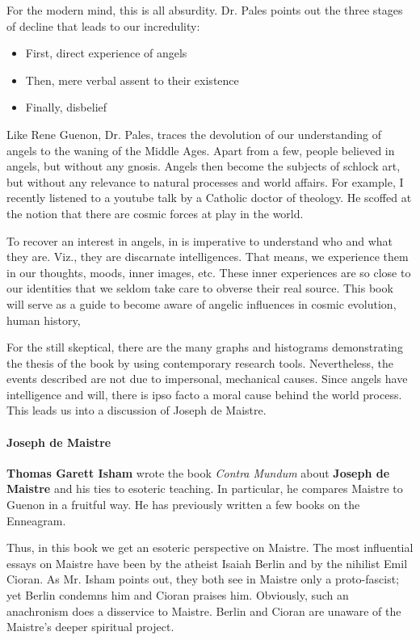 For the modern mind, this is all absurdity. Dr. Pales points out the three stages of decline that leads to our incredulity:

\begin{itemize}


\item First, direct experience of angels

\item Then, mere verbal assent to their existence

\item Finally, disbelief
\end{itemize}


Like Rene Guenon, Dr. Pales, traces the devolution of our understanding of angels to the waning of the Middle Ages. Apart from a few, people believed in angels, but without any gnosis. Angels then become the subjects of schlock art, but without any relevance to natural processes and world affairs. For example, I recently listened to a youtube talk by a Catholic doctor of theology. He scoffed at the notion that there are cosmic forces at play in the world.

To recover an interest in angels, in is imperative to understand who and what they are. Viz., they are discarnate intelligences. That means, we experience them in our thoughts, moods, inner images, etc. These inner experiences are so close to our identities that we seldom take care to obverse their real source. This book will serve as a guide to become aware of angelic influences in cosmic evolution, human history,

For the still skeptical, there are the many graphs and histograms demonstrating the thesis of the book by using contemporary research tools. Nevertheless, the events described are not due to impersonal, mechanical causes. Since angels have intelligence and will, there is ipso facto a moral cause behind the world process. This leads us into a discussion of Joseph de Maistre.

\paragraph{Joseph de Maistre}


\textbf{Thomas Garett Isham} wrote the book \emph{Contra Mundum} about \textbf{Joseph de Maistre} and his ties to esoteric teaching. In particular, he compares Maistre to Guenon in a fruitful way. He has previously written a few books on the Enneagram.

Thus, in this book we get an esoteric perspective on Maistre. The most influential essays on Maistre have been by the atheist Isaiah Berlin and by the nihilist Emil Cioran. As Mr. Isham points out, they both see in Maistre only a proto-fascist; yet Berlin condemns him and Cioran praises him. Obviously, such an anachronism does a disservice to Maistre. Berlin and Cioran are unaware of the Maistre's deeper spiritual project.

